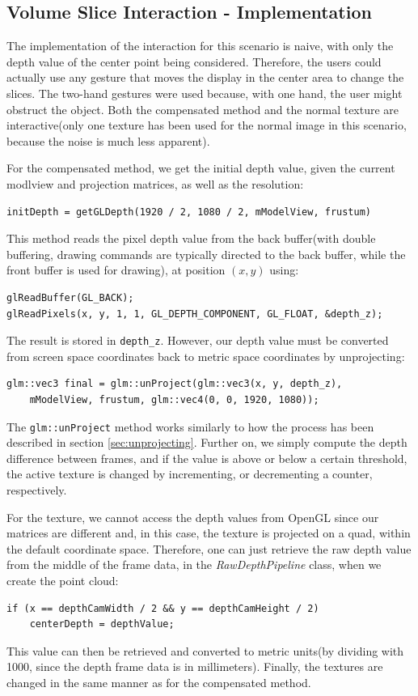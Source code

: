 \documentclass[]{article}
\begin{document}
\begin{appendices}
\subsection{Volume Slice Interaction - Implementation}
\label{appendix:B-vsi}

The implementation of the interaction for this scenario is naive, with only the depth value of the center point being considered. Therefore, the users could actually use any gesture that moves the display in the center area to change the slices. The two-hand gestures were used because, with one hand, the user might obstruct the object. Both the compensated method and the normal texture are interactive(only one texture has been used for the normal image in this scenario, because the noise is much less apparent).

For the compensated method, we get the initial depth value, given the current modlview and projection matrices, as well as the resolution:
\begin{verbatim}
initDepth = getGLDepth(1920 / 2, 1080 / 2, mModelView, frustum)
\end{verbatim}
This method reads the pixel depth value from the back buffer(with double buffering, drawing commands are typically directed to the back buffer, while the front buffer is used for drawing), at position $(x,y)$ using:
\begin{verbatim}
glReadBuffer(GL_BACK);
glReadPixels(x, y, 1, 1, GL_DEPTH_COMPONENT, GL_FLOAT, &depth_z);
\end{verbatim}
The result is stored in \verb|depth_z|. However, our depth value must be converted from screen space coordinates back to metric space coordinates by unprojecting:
\begin{verbatim}
glm::vec3 final = glm::unProject(glm::vec3(x, y, depth_z),
    mModelView, frustum, glm::vec4(0, 0, 1920, 1080));
\end{verbatim}
The \verb|glm::unProject| method works similarly to how the process has been described in section \ref{sec:unprojecting}. Further on, we simply compute the depth difference between frames, and if the value is above or below a certain threshold, the active texture is changed by incrementing, or decrementing a counter, respectively.

For the texture, we cannot access the depth values from OpenGL since our matrices are different and, in this case, the texture is projected on a quad, within the default coordinate space. Therefore, one can just retrieve the raw depth value from the middle of the frame data, in the \textit{RawDepthPipeline} class, when we create the point cloud:
\begin{verbatim}
if (x == depthCamWidth / 2 && y == depthCamHeight / 2)
	centerDepth = depthValue;
\end{verbatim}
This value can then be retrieved and converted to metric units(by dividing with 1000, since the depth frame data is in millimeters). Finally, the textures are changed in the same manner as for the compensated method.
\clearpage{\pagestyle{empty}\cleardoublepage}

\end{appendices}
\end{document}
